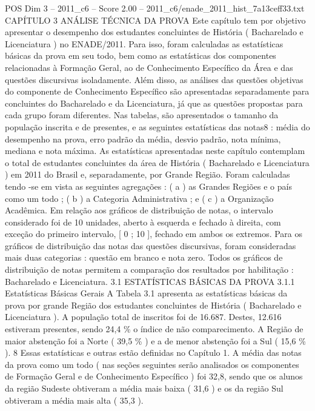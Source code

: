\begin{textsample}{POS Dim 3 – 2011\_c6 – Score 2.00 – 2011\_c6/enade\_2011\_hist\_7a13ceff33.txt}  \label{ex:f3_pos_204}
CAPÍTULO 3 ANÁLISE TÉCNICA DA PROVA Este capítulo tem por objetivo apresentar o desempenho dos estudantes concluintes de História ( Bacharelado e Licenciatura ) no ENADE/2011.
Para isso, foram calculadas as estatísticas básicas da prova em seu todo, bem como as estatísticas dos componentes relacionadas à Formação Geral, ao de Conhecimento Específico da Área e das questões discursivas isoladamente.
Além disso, as análises das questões objetivas do componente de Conhecimento Específico são apresentadas separadamente para concluintes do Bacharelado e da Licenciatura, já que as questões propostas para cada grupo foram diferentes.
Nas tabelas, são apresentados o tamanho da população inscrita e de presentes, e as seguintes estatísticas das notas8 : média do desempenho na prova, erro padrão da média, desvio padrão, nota mínima, mediana e nota máxima.
As estatísticas apresentadas neste capítulo contemplam o total de estudantes concluintes da área de História ( Bacharelado e Licenciatura ) em 2011 do Brasil e, separadamente, por Grande Região.
Foram calculadas tendo -se em vista as seguintes agregações : ( a ) as Grandes Regiões e o país como um todo ; ( b ) a Categoria Administrativa ; e ( c ) a Organização Acadêmica.
Em relação aos gráficos de distribuição de notas, o intervalo considerado foi de 10 unidades, aberto à esquerda e fechado à direita, com exceção do primeiro intervalo, [ 0 ; 10 ], fechado em ambos os extremos.
Para os gráficos de distribuição das notas das questões discursivas, foram consideradas mais duas categorias : questão em branco e nota zero.
Todos os gráficos de distribuição de notas permitem a comparação dos resultados por habilitação : Bacharelado e Licenciatura. 3.1 ESTATÍSTICAS BÁSICAS DA PROVA 3.1.1 Estatísticas Básicas Gerais A Tabela 3.1 apresenta as estatísticas básicas da prova por grande Região dos estudantes concluintes de História ( Bacharelado e Licenciatura ).
A população total de inscritos foi de 16.687.
Destes, 12.616 estiveram presentes, sendo 24,4 \% o índice de não comparecimento.
A Região de maior abstenção foi a Norte ( 39,5 \% ) e a de menor abstenção foi a Sul ( 15,6 \% ). 8 Essas estatísticas e outras estão definidas no Capítulo 1.
A média das notas da prova como um todo ( nas seções seguintes serão analisados os componentes de Formação Geral e de Conhecimento Específico ) foi 32,8, sendo que os alunos da região Sudeste obtiveram a média mais baixa ( 31,6 ) e os da região Sul obtiveram a média mais alta ( 35,3 ).

\end{textsample}
